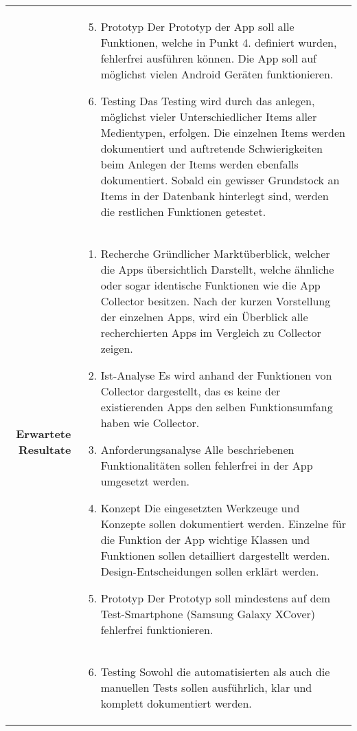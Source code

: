 \begin{longtable}{rp{12cm}}
	& \begin{enumerate}
		\setcounter {enumi}{4}
	  \item Prototyp \newline
		  Der Prototyp der App soll alle Funktionen, welche in Punkt 4. definiert wurden, fehlerfrei ausführen können. Die App soll auf möglichst vielen Android Geräten funktionieren.
	  \item Testing \newline
		  Das Testing wird durch das anlegen, möglichst vieler Unterschiedlicher Items aller Medientypen, erfolgen. Die einzelnen Items werden dokumentiert und auftretende Schwierigkeiten beim Anlegen der Items werden ebenfalls dokumentiert. Sobald ein gewisser Grundstock an Items in der Datenbank hinterlegt sind, werden die restlichen Funktionen getestet.
	\end{enumerate} \\
	\textbf{Erwartete Resultate} & \begin{enumerate}
		\item Recherche \newline
			Gründlicher Marktüberblick, welcher die Apps übersichtlich Darstellt, welche ähnliche oder sogar identische Funktionen wie die App Collector besitzen. Nach der kurzen Vorstellung der einzelnen Apps, wird ein Überblick alle recherchierten Apps im Vergleich zu Collector zeigen.
		\item Ist-Analyse \newline
			Es wird anhand der Funktionen von Collector dargestellt, das es keine der existierenden Apps den selben Funktionsumfang haben wie Collector.
		\item Anforderungsanalyse \newline
			Alle beschriebenen Funktionalitäten sollen fehlerfrei in der App umgesetzt werden.
		\item Konzept \newline
			Die eingesetzten Werkzeuge und Konzepte sollen dokumentiert werden. Einzelne für die Funktion der App wichtige Klassen und Funktionen sollen detailliert dargestellt werden. Design-Entscheidungen sollen erklärt werden. 
		\item Prototyp \newline
			Der Prototyp soll mindestens auf dem Test-Smartphone (Samsung Galaxy XCover) fehlerfrei funktionieren.
	\end{enumerate}\\
	& \begin{enumerate}
		\setcounter{enumi}{5}
		\item Testing \newline
			Sowohl die automatisierten als auch die manuellen Tests sollen ausführlich, klar und komplett dokumentiert werden.
	\end{enumerate}
\end{longtable}